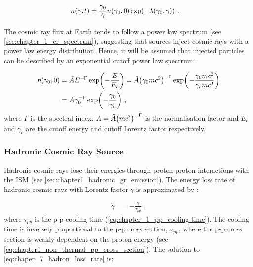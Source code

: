 \begin{equation}
    \begin{aligned}
    n\qty(\gamma,t)&=\frac{\dot{\gamma_0}}{\dot{\gamma}}n\qty(\gamma_0,0)\exp(-\lambda\qty(\gamma_0,\gamma))\text{ .}
    \end{aligned} \label{eq:chapter_7_cr_energy_distribution_imp} 
\end{equation}

The cosmic ray flux at Earth tends to follow a power law spectrum (see \autoref{sec:chapter_1_cr_spectrum}), suggesting that sources inject cosmic rays with a power law energy distribution. Hence, it will be assumed that injected particles can be described by an exponential cutoff power law spectrum:

\begin{equation}
    \begin{aligned}
    n\qty(\gamma_0,0)&=\tilde{A}E^{-\Gamma}\exp(-\frac{E}{E_c})=\tilde{A}\qty(\gamma_0 mc^2)^{-\Gamma}\exp(-\frac{\gamma_0 mc^2}{\gamma_c mc^2}) \\
	&=A\gamma_0^{-\Gamma}\exp(-\frac{\gamma_0}{\gamma_c})\text{ ,}
    \end{aligned} \label{eq:chapter_7_cr_energy_distribution_imp_t0} 
\end{equation}
\noindent where $\Gamma$ is the spectral index, $A=\tilde{A}\qty(mc^2)^{-\Gamma}$ is the normalisation factor and $E_c$ and $\gamma_c$ are the cutoff energy and cutoff Lorentz factor respectively.

\subsubsection{Hadronic Cosmic Ray Source}

Hadronic cosmic rays lose their energies through proton-proton interactions with the ISM (see \autoref{sec:chapter1_hadronic_gr_emission}). The energy loss rate of hadronic cosmic rays with Lorentz factor $\gamma$ is approximated by \cite{1996A&A...309..917A}:

\begin{equation}
    \begin{aligned}
    \dot{\gamma}&=-\frac{\gamma}{\tau_{pp}} \text{ ,}
    \end{aligned} \label{eq:chaper_7_hadron_loss_rate}
\end{equation}
\noindent where $\tau_{pp}$ is the p-p cooling time (\autoref{eq:chapter_1_pp_cooling time}). The cooling time is inversely proportional to the p-p cross section, $\sigma_{pp}$, where the p-p cross section is weakly dependent on the proton energy (see \autoref{eq:chapter1_non_thermal_pp_cross_section}). The solution to \autoref{eq:chaper_7_hadron_loss_rate} is:

